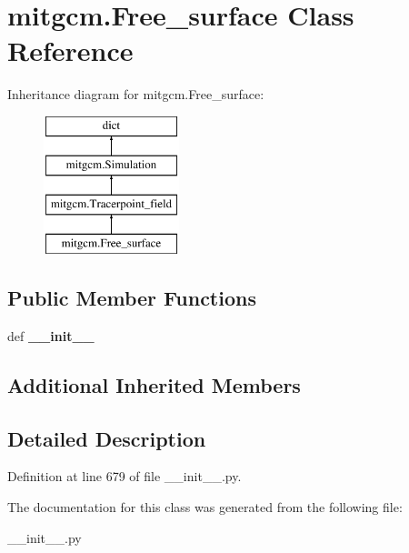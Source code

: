 \hypertarget{classmitgcm_1_1Free__surface}{\section{mitgcm.\+Free\+\_\+surface Class Reference}
\label{classmitgcm_1_1Free__surface}
}
Inheritance diagram for mitgcm.\+Free\+\_\+surface\+:\begin{figure}[H]
\begin{center}
\leavevmode
\includegraphics[height=4.000000cm]{classmitgcm_1_1Free__surface}
\end{center}
\end{figure}
\subsection*{Public Member Functions}
\begin{DoxyCompactItemize}
\item 
\hypertarget{classmitgcm_1_1Free__surface_a92630a9966a8f863bfa7d58aa844ad41}{def {\bfseries \+\_\+\+\_\+init\+\_\+\+\_\+}}\label{classmitgcm_1_1Free__surface_a92630a9966a8f863bfa7d58aa844ad41}

\end{DoxyCompactItemize}
\subsection*{Additional Inherited Members}


\subsection{Detailed Description}


Definition at line 679 of file \+\_\+\+\_\+init\+\_\+\+\_\+.\+py.



The documentation for this class was generated from the following file\+:\begin{DoxyCompactItemize}
\item 
\+\_\+\+\_\+init\+\_\+\+\_\+.\+py\end{DoxyCompactItemize}

